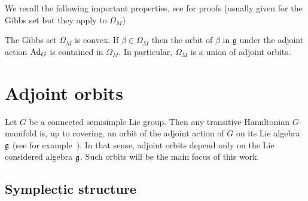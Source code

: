\documentclass[english]{article}
\begin{document}
We recall the following important properties, see \cite{SSDEng, MarleExamples} for proofs (usually given for the Gibbs set but they apply to $\Omega_M$)
\begin{proposition}\label{propno:GibbsSetProperties}
    The Gibbs set $\Omega_M$ is convex. If $\beta\in \Omega_M$ then the orbit of $\beta$ in $\mathfrak{g}$ under the adjoint action $\operatorname{Ad}_G$ is contained in $\Omega_M$. In particular, $\Omega_M$ is a union of adjoint orbits.
\end{proposition}


\section{Adjoint orbits}\label{secno:AdjointOrbits}

Let $G$ be a connected semisimple Lie group. Then any transitive Hamiltonian $G$-manifold is, up to covering, an orbit of the adjoint action of $G$ on its Lie algebra $\mathfrak g$ (see for example~\cite{KirillovOrbitMethod}). In that sense, adjoint orbits depend only on the Lie considered algebra $\mathfrak g$. Such orbits will be the main focus of this work.

\subsection{Symplectic structure}
\label{secno:AdjointOrbitsSymplectic}
\end{document}
